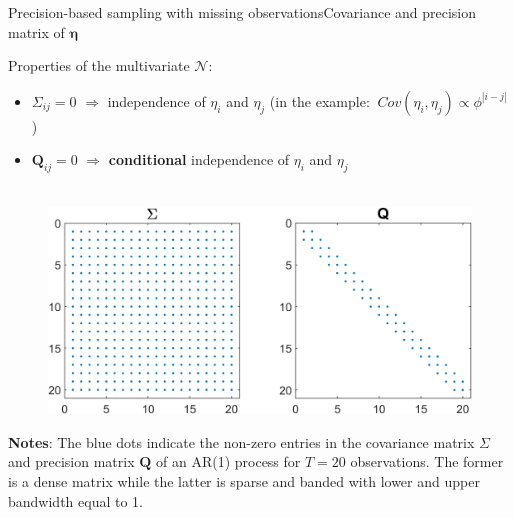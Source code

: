 \documentclass[xcolor=svgnames, 10pt, aspectratio=169]{beamer}
\begin{document}
\begin{frame}{Precision-based sampling with missing observations}{Covariance and precision matrix of $\boldsymbol{\eta}$}

    Properties of the multivariate $\mathcal{N}$: 

    \begin{itemize}
        \item $\Sigma_{ij} = 0$ $\Longrightarrow$ independence of $\eta_i$ and $\eta_j$ (in the example: $\:Cov(\eta_i, \eta_j) \propto \phi^{|i-j|}$)
        \item $\mathbf{Q}_{ij} = 0$ $\Longrightarrow$ \textbf{conditional} independence of $\eta_i$ and $\eta_j$ \\~\\
    \end{itemize}    

    \begin{adjustbox}{minipage=0.7\textwidth,center}
        \begin{figure}
            \includegraphics[scale = 0.65]{fig_Sigma_Q.png}  \vspace{0.1cm} \\
        \end{figure}
            {\tiny \textbf{Notes}: The blue dots indicate the non-zero entries in the covariance matrix $\Sigma$ and precision matrix $\mathbf{Q}$ of an AR(1) process for $T=20$ observations. The former is a dense matrix while the latter is sparse and banded with lower and upper bandwidth equal to 1.}\par
    \end{adjustbox}
\end{frame}
\end{document}

